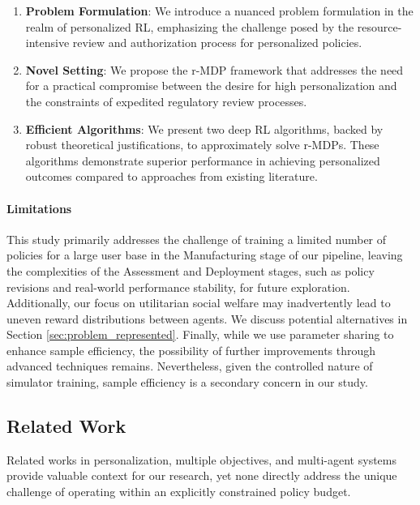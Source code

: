 \documentclass[letterpaper]{article} %
\begin{document}
\begin{enumerate}
    \item \textbf{Problem Formulation}: We introduce a nuanced problem formulation in the realm of personalized RL, emphasizing the challenge posed by the resource-intensive review and authorization process for personalized policies.

    \item \textbf{Novel Setting}: We propose the r-MDP framework that addresses the need for a practical compromise between the desire for high personalization and the constraints of expedited regulatory review processes.

    \item \textbf{Efficient Algorithms}: We present two deep RL algorithms, backed by robust theoretical justifications, to approximately solve r-MDPs. These algorithms demonstrate superior performance in achieving personalized outcomes compared to approaches from existing literature.
\end{enumerate}



\paragraph{Limitations}

This study primarily addresses the challenge of training a limited number of policies for a large user base in the Manufacturing stage of our pipeline, leaving the complexities of the Assessment and Deployment stages, such as policy revisions and real-world performance stability, for future exploration. Additionally, our focus on utilitarian social welfare may inadvertently lead to uneven reward distributions between agents. We discuss potential alternatives in Section \ref{sec:problem_represented}. Finally, while we use parameter sharing to enhance sample efficiency, the possibility of further improvements through advanced techniques remains. Nevertheless, given the controlled nature of simulator training, sample efficiency is a secondary concern in our study.





\subsection{Related Work}\label{sec:introduction_related}

Related works in personalization, multiple objectives, and multi-agent systems provide valuable context for our research, yet none directly address the unique challenge of operating within an explicitly constrained policy budget.
\end{document}
